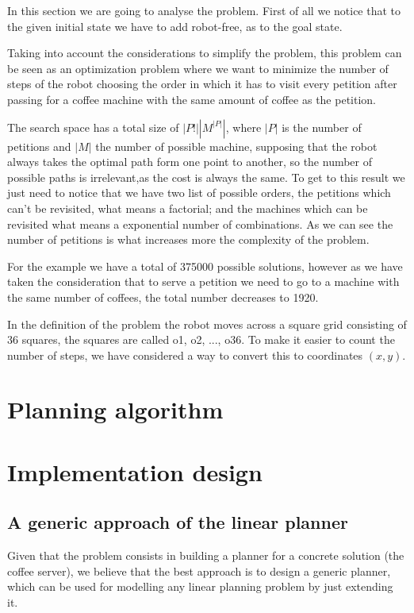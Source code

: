 \documentclass[12pt,a4paper,oneside]{article}
\numberwithin{equation}{section}
\numberwithin{equation}{section}
\theoremstyle{definition}
\begin{document}
In this section we are going to  analyse the problem. First of all we notice that to the given initial state we have to  add robot-free, as to the goal state.

Taking into account the considerations to simplify the problem, this problem can be seen as an optimization problem where we want to minimize the number of steps of the robot choosing the order in which it has to visit every petition after passing for a coffee machine with the same amount of coffee as the petition. 

The search space has a total size of $|P!||M^{|P|}|$, where $|P|$ is the number of petitions and $|M|$ the number of possible machine, supposing that the robot always takes the optimal path form one point to another, so the number of possible paths is irrelevant,as the cost is always the same. To get to this result we just need to notice that we have two list of possible orders, the petitions which can't be revisited, what means a factorial; and the machines which can be revisited what means a exponential number of combinations. As we can see the number of petitions is what increases more the complexity of the problem.

For the example we have a total of 375000 possible solutions, however as we have taken the consideration that to serve a petition we need to go to a machine with the same number of coffees, the total number decreases to 1920.

In the definition of the problem the robot moves across a square grid consisting of 36 squares, the squares are called o1, o2, ..., o36. To make it easier to count the number of steps, we have considered a way to convert this to coordinates $(x,y)$.


\section{Planning algorithm}


\section{Implementation design}

\subsection{A generic approach of the linear planner}
Given that the problem consists in building a planner for a concrete solution (the coffee server), we believe that the best approach is to design a generic planner, which can be used for modelling any linear planning problem by just extending it.
\end{document}
